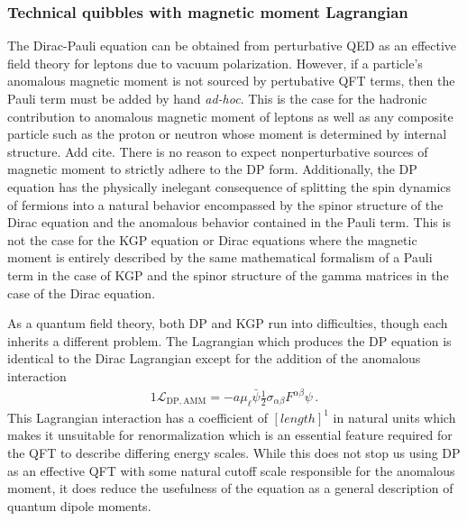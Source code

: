 \subsubsection{Technical quibbles with magnetic moment Lagrangian}
The Dirac-Pauli equation can be obtained from perturbative QED \cite{Itzykson:1980rh,Thaller:2013,Schwartz:2014sze} as an effective field theory for leptons due to vacuum polarization. However, if a particle's anomalous magnetic moment is not sourced by pertubative QFT terms, then the Pauli term must be added by hand \emph{ad-hoc}. This is the case for the hadronic contribution to anomalous magnetic moment of leptons as well as any composite particle such as the proton or neutron whose moment is determined by internal structure. {\color{red}Add cite.} There is no reason to expect nonperturbative sources of magnetic moment to strictly adhere to the DP form. Additionally, the DP equation has the physically inelegant consequence of splitting the spin dynamics of fermions into a natural behavior encompassed by the spinor structure of the Dirac equation and the anomalous behavior contained in the Pauli term. This is not the case for the KGP equation or Dirac equations where the magnetic moment is entirely described by the same mathematical formalism of a Pauli term in the case of KGP and the spinor structure of the gamma matrices in the case of the Dirac equation.

As a quantum field theory, both DP and KGP run into difficulties, though each inherits a different problem. The Lagrangian which produces the DP equation is identical to the Dirac Lagrangian except for the addition of the anomalous interaction
\begin{alignat}{1}
	\label{eq:problems01} \mathcal{L}_{\mathrm{DP,AMM}}=-a\mu_{\ell}\bar{\psi}\frac{1}{2}\sigma_{\alpha\beta}F^{\alpha\beta}\psi\,.
\end{alignat}
This Lagrangian interaction has a coefficient of $[length]^{1}$ in natural units which makes it unsuitable for renormalization which is an essential feature required for the QFT to describe differing energy scales. While this does not stop us using DP as an effective QFT with some natural cutoff scale responsible for the anomalous moment, it does reduce the usefulness of the equation as a general description of quantum dipole moments.


